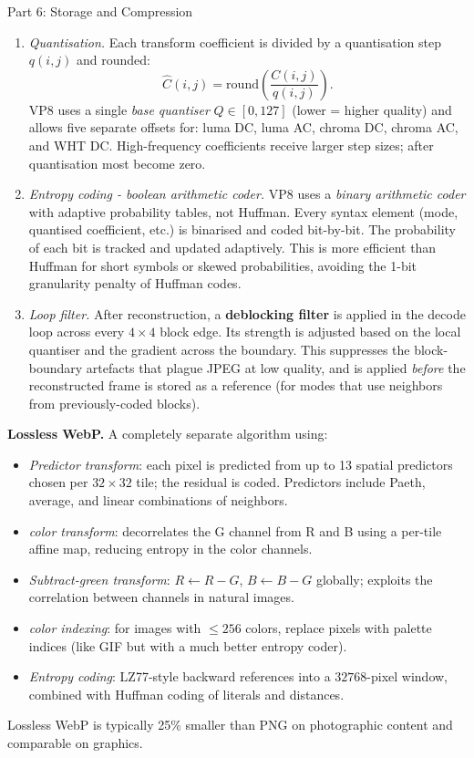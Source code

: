 \documentclass[letterpaper]{article}
\begin{document}
\begin{notes}{Part 6: Storage and Compression}
\begin{enumerate}
    \item \textit{Quantisation.} Each transform coefficient is divided by a quantisation step $q(i,j)$ and rounded:
    $$\hat{C}(i,j) = \mathrm{round}\!\left(\frac{C(i,j)}{q(i,j)}\right).$$
    VP8 uses a single \emph{base quantiser} $Q \in [0, 127]$ (lower = higher quality) and allows five separate offsets for: luma DC, luma AC, chroma DC, chroma AC, and WHT DC. High-frequency coefficients receive larger step sizes; after quantisation most become zero.
    
    \item \textit{Entropy coding - boolean arithmetic coder.} VP8 uses a \emph{binary arithmetic coder} with adaptive probability tables, not Huffman. Every syntax element (mode, quantised coefficient, etc.) is binarised and coded bit-by-bit. The probability of each bit is tracked and updated adaptively. This is more efficient than Huffman for short symbols or skewed probabilities, avoiding the 1-bit granularity penalty of Huffman codes.
    
    \item \textit{Loop filter.} After reconstruction, a \textbf{deblocking filter} is applied in the decode loop across every $4\times4$ block edge. Its strength is adjusted based on the local quantiser and the gradient across the boundary. This suppresses the block-boundary artefacts that plague JPEG at low quality, and is applied \emph{before} the reconstructed frame is stored as a reference (for modes that use neighbors from previously-coded blocks).
\end{enumerate}



\textbf{Lossless WebP.} A completely separate algorithm using:
\begin{itemize}
    \item \emph{Predictor transform}: each pixel is predicted from up to 13 spatial predictors chosen per $32\times32$ tile; the residual is coded. Predictors include Paeth, average, and linear combinations of neighbors.
    \item \emph{color transform}: decorrelates the G channel from R and B using a per-tile affine map, reducing entropy in the color channels.
    \item \emph{Subtract-green transform}: $R \leftarrow R - G$, $B \leftarrow B - G$ globally; exploits the correlation between channels in natural images.
    \item \emph{color indexing}: for images with $\le 256$ colors, replace pixels with palette indices (like GIF but with a much better entropy coder).
    \item \emph{Entropy coding}: LZ77-style backward references into a $32768$-pixel window, combined with Huffman coding of literals and distances.
\end{itemize}
Lossless WebP is typically 25\% smaller than PNG on photographic content and comparable on graphics.\\


\end{notes}
\end{document}
